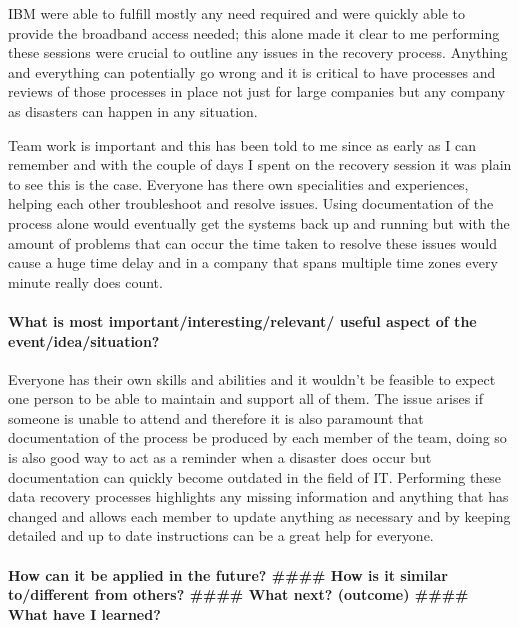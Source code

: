 IBM were able to fulfill mostly any need required and were quickly able
to provide the broadband access needed; this alone made it clear to me
performing these sessions were crucial to outline any issues in the
recovery process. Anything and everything can potentially go wrong and
it is critical to have processes and reviews of those processes in place
not just for large companies but any company as disasters can happen in
any situation.

Team work is important and this has been told to me since as early as I
can remember and with the couple of days I spent on the recovery session
it was plain to see this is the case. Everyone has there own
specialities and experiences, helping each other troubleshoot and
resolve issues. Using documentation of the process alone would
eventually get the systems back up and running but with the amount of
problems that can occur the time taken to resolve these issues would
cause a huge time delay and in a company that spans multiple time zones
every minute really does count.

\paragraph{What is most important/interesting/relevant/ useful aspect of
the
event/idea/situation?}\label{what-is-most-importantinterestingrelevant-useful-aspect-of-the-eventideasituation}

Everyone has their own skills and abilities and it wouldn't be feasible
to expect one person to be able to maintain and support all of them. The
issue arises if someone is unable to attend and therefore it is also
paramount that documentation of the process be produced by each member
of the team, doing so is also good way to act as a reminder when a
disaster does occur but documentation can quickly become outdated in the
field of IT. Performing these data recovery processes highlights any
missing information and anything that has changed and allows each member
to update anything as necessary and by keeping detailed and up to date
instructions can be a great help for everyone.

\paragraph{How can it be applied in the future? \#\#\#\# How is it
similar to/different from others? \#\#\#\# What next? (outcome) \#\#\#\#
What have I
learned?}\label{how-can-it-be-applied-in-the-future-how-is-it-similar-todifferent-from-others-what-next-outcome-what-have-i-learned}

